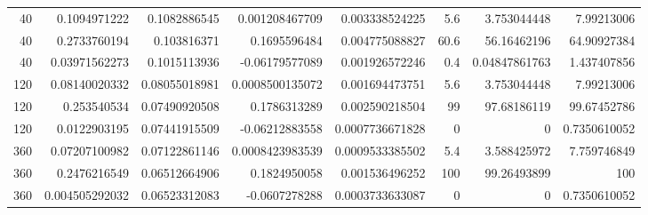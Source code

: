 \begin{tabular}{rrrrrrrr}
40 & 0.1094971222 & 0.1082886545 & 0.001208467709 & 0.003338524225 & 5.6 & 3.753044448 & 7.99213006 \\
40 & 0.2733760194 & 0.103816371 & 0.1695596484 & 0.004775088827 & 60.6 & 56.16462196 & 64.90927384 \\
40 & 0.03971562273 & 0.1015113936 & -0.06179577089 & 0.001926572246 & 0.4 & 0.04847861763 & 1.437407856 \\
120 & 0.08140020332 & 0.08055018981 & 0.0008500135072 & 0.001694473751 & 5.6 & 3.753044448 & 7.99213006 \\
120 & 0.253540534 & 0.07490920508 & 0.1786313289 & 0.002590218504 & 99 & 97.68186119 & 99.67452786 \\
120 & 0.0122903195 & 0.07441915509 & -0.06212883558 & 0.0007736671828 & 0 & 0 & 0.7350610052 \\
360 & 0.07207100982 & 0.07122861146 & 0.0008423983539 & 0.0009533385502 & 5.4 & 3.588425972 & 7.759746849 \\
360 & 0.2476216549 & 0.06512664906 & 0.1824950058 & 0.001536496252 & 100 & 99.26493899 & 100 \\
360 & 0.004505292032 & 0.06523312083 & -0.0607278288 & 0.0003733633087 & 0 & 0 & 0.7350610052 \\
\end{tabular}
